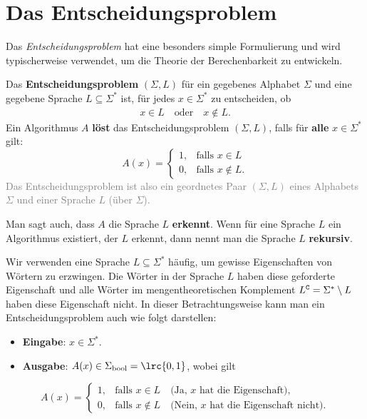 \section{Das Entscheidungsproblem}
Das \textit{Entscheidungsproblem} hat eine besonders simple Formulierung und wird typischerweise verwendet, um die Theorie der Berechenbarkeit zu entwickeln.
\begin{mydefinition}[Entscheidungsproblem]\label{mydefinition:Entscheidungsproblem}
Das \textbf{Entscheidungsproblem} $(\Sigma,L)$ für ein gegebenes Alphabet $\Sigma$ und eine gegebene Sprache $L\subseteq \Sigma^*$ ist, für jedes $x\in\Sigma^*$ zu entscheiden, ob
\begin{align*}
	x\in L\quad \text{oder}\quad x\notin L.
\end{align*}
Ein Algorithmus $A$ \textbf{löst} das Entscheidungsproblem $(\Sigma,L)$, falls für \textbf{alle} $x\in\Sigma^*$ gilt:
\[
	A(x) =
	\begin{cases}
		1, & \text{falls } x\in L     \\
		0, & \text{falls } x\notin L.
	\end{cases}
\]
\textcolor{Gray}{Das Entscheidungsproblem ist also ein geordnetes Paar $(\Sigma,L)$ eines Alphabets $\Sigma$ und einer Sprache $L$ (über $\Sigma$).}
\end{mydefinition}
Man sagt auch, dass $A$ die Sprache $L$ \textbf{erkennt}. Wenn für eine Sprache $L$ ein Algorithmus existiert, der $L$ erkennt, dann nennt man die Sprache $L$ \textbf{rekursiv}.

Wir verwenden eine Sprache $L\subseteq \Sigma^*$ häufig, um gewisse Eigenschaften von Wörtern zu erzwingen. Die Wörter in der Sprache $L$ haben diese geforderte Eigenschaft und alle Wörter im mengentheoretischen Komplement $L^{\tt C} = \Sigma^* \setminus L$ haben diese Eigenschaft nicht. In dieser Betrachtungsweise kann man ein Entscheidungsproblem auch wie folgt darstellen:
\begin{itemize}
	\item \textbf{Eingabe}: $x\in\Sigma^*$.
	\item \textbf{Ausgabe}: $A(x)\in\Sigma_{\text{bool}} = \lrc{0,1}$, wobei gilt
\end{itemize}
\[
	A(x) =
	\begin{cases}
		1, & \text{falls } x\in L\quad \text{(Ja, $x$ hat die Eigenschaft)},            \\
		0, & \text{falls } x\notin L\quad \text{(Nein, $x$ hat die Eigenschaft nicht)}.
	\end{cases}
\]

